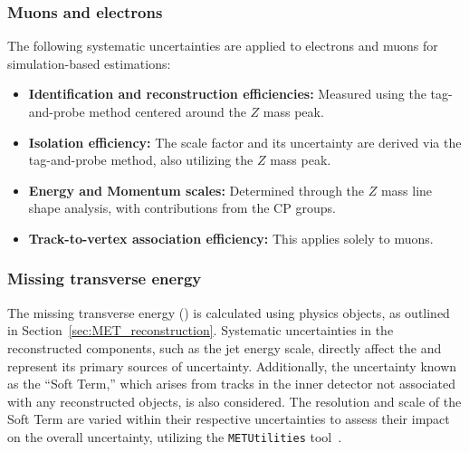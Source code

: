 \subsubsection*{Muons and electrons}
The following systematic uncertainties are applied to electrons and muons for simulation-based estimations:

\begin{itemize}
    \item \textbf{Identification and reconstruction efficiencies:} Measured using the tag-and-probe method centered around the $Z$ mass peak.
    \item \textbf{Isolation efficiency:} The scale factor and its uncertainty are derived via the tag-and-probe method, also utilizing the $Z$ mass peak.
    \item \textbf{Energy and Momentum scales:} Determined through the $Z$ mass line shape analysis, with contributions from the CP groups.
    \item \textbf{Track-to-vertex association efficiency:} This applies solely to muons.
\end{itemize}


\subsubsection*{Missing transverse energy}

The missing transverse energy (\met) is calculated using physics objects, as outlined in Section~\ref{sec:MET_reconstruction}. 
Systematic uncertainties in the reconstructed components, such as the jet energy scale, directly affect the \met and represent its primary sources of uncertainty. Additionally, the uncertainty known as the ``Soft Term,'' which arises from tracks in the inner detector not associated with any reconstructed objects, is also considered. The resolution and scale of the Soft Term are varied within their respective uncertainties to assess their impact on the overall \met uncertainty, utilizing the \texttt{METUtilities} tool~\cite{METUtilSystematics}.

